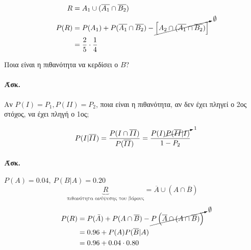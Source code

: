 \documentclass[11pt,a4paper,titlepage,draft]{article}
\begin{document}

\begin{align*}
R &= A_1 \cup (\overline{A_1} \cap \overline{B_2}) \\
P(R) &= P(A_1)+P(\overline{A_1} \cap \overline{B_2})
- \cancelto{\emptyset}{\left[
A_2 \cap (\overline{A_1} \cap \overline{B_2})
\right]} \\
&= \frac{2}{5} \cdot \frac{1}{4}
\end{align*}

Ποια είναι η πιθανότητα να κερδίσει ο \(B\)?

\paragraph{Άσκ.}


Αν \(P(I)=P_1, P(II)=P_2\), ποια είναι η πιθανότητα, αν δεν έχει πληγεί ο 2ος στόχος, να έχει πληγή ο 1ος;

\[
P(I|\overline{II}) =
\frac{P(I \cap \overline{II})}{P(\overline{II})} =
\frac{P(I)\cancelto{1}{P(\overline{II}|I)}}{1-P_2}
\]

\paragraph{Άσκ.}
\(P(A) = 0.04,\ P(B|A)=0.20\)
\[
\underbrace{R}_\text{πιθανότητα ανύψυσης του βάρους} = \overline{A} \cup (A \cap \overline{B})
\]
\begin{align*}
P(R) &= P(\bar{A})+P(A \cap \overline{B}) -
\cancelto{\emptyset}{P
\left(
\overline{A} \cap (A \cap \overline{B})
\right)
} \\
&= 0.96 + P(A)P(\overline{B}|A) \\
&= 0.96+0.04\cdot0.80
\end{align*}
\end{document}
